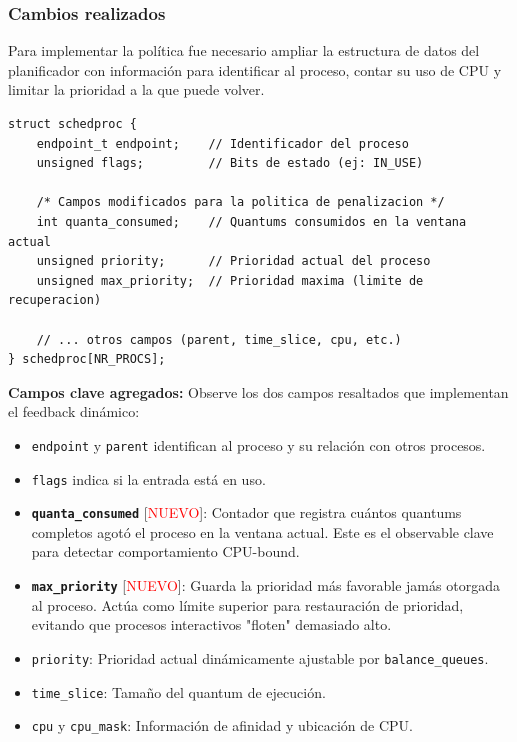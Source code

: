 \documentclass[12pt,spanish]{article}
\begin{document}
\subsubsection*{Cambios realizados}

Para implementar la política fue necesario ampliar la estructura de datos del planificador con información para identificar al proceso, contar su uso de CPU y limitar la prioridad a la que puede volver.

\begin{lstlisting}[caption=Estructura de datos modificada en schedproc.h]
struct schedproc {
    endpoint_t endpoint;    // Identificador del proceso
    unsigned flags;         // Bits de estado (ej: IN_USE)

    /* Campos modificados para la politica de penalizacion */
    int quanta_consumed;    // Quantums consumidos en la ventana actual
    unsigned priority;      // Prioridad actual del proceso
    unsigned max_priority;  // Prioridad maxima (limite de recuperacion)

    // ... otros campos (parent, time_slice, cpu, etc.)
} schedproc[NR_PROCS];
\end{lstlisting}

\textbf{Campos clave agregados:} Observe los dos campos resaltados que implementan el feedback dinámico:

\begin{itemize}
    \item \texttt{endpoint} y \texttt{parent} identifican al proceso y su relación con otros procesos.
    \item \texttt{flags} indica si la entrada está en uso.
    \item \textbf{\texttt{quanta\_consumed}} [\textcolor{red}{NUEVO}]: Contador que registra cuántos quantums completos agotó el proceso en la ventana actual. Este es el observable clave para detectar comportamiento CPU-bound.
    \item \textbf{\texttt{max\_priority}} [\textcolor{red}{NUEVO}]: Guarda la prioridad más favorable jamás otorgada al proceso. Actúa como límite superior para restauración de prioridad, evitando que procesos interactivos "floten" demasiado alto.
    \item \texttt{priority}: Prioridad actual dinámicamente ajustable por \texttt{balance\_queues}.
    \item \texttt{time\_slice}: Tamaño del quantum de ejecución.
    \item \texttt{cpu} y \texttt{cpu\_mask}: Información de afinidad y ubicación de CPU.
\end{itemize}
\end{document}
